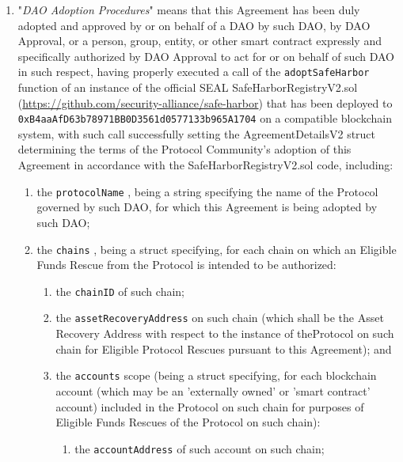 \documentclass{article}
\newcommand{\code}[1]{%
    \colorbox{red!10}{\textcolor{orange!80!black}{\texttt{#1}}}%
}
\begin{document}
\begin{enumerate}
    \item "\textit{DAO Adoption Procedures}" means that this Agreement has been duly adopted and approved by or on behalf of a DAO by such DAO, by DAO Approval, or a person, group, entity, or other smart contract expressly and specifically authorized by DAO Approval to act for or on behalf of such DAO in such respect, having properly executed a call of the \code{adoptSafeHarbor} function of an instance of the official SEAL SafeHarborRegistryV2.sol (\url{https://github.com/security-alliance/safe-harbor}) that has been deployed to \code{0xB4aaAfD63b78971BB0D3561d0577133b965A1704} on a compatible blockchain system, with such call successfully setting the AgreementDetailsV2 struct determining the terms of the Protocol Community's adoption of this Agreement in accordance with the SafeHarborRegistryV2.sol code, including:

          \begin{enumerate}
              \item the \code{protocolName}, being a string specifying the name of the Protocol governed by such DAO, for which this Agreement is being adopted by such DAO;

              \item the \code{chains}, being a struct specifying, for each chain on which an Eligible Funds Rescue from the Protocol is intended to be authorized:

                    \begin{enumerate}
                        \item the \code{chainID} of such chain;

                        \item the \code{assetRecoveryAddress} on such chain (which shall be the Asset Recovery Address with respect to the instance of theProtocol on such chain for Eligible Protocol Rescues pursuant to this Agreement); and

                        \item the \code{accounts} scope (being a struct specifying, for each blockchain account (which may be an 'externally owned' or 'smart contract' account) included in the Protocol on such chain for purposes of Eligible Funds Rescues of the Protocol on such chain):

                              \begin{enumerate}
                                  \item the \code{accountAddress} of such account on such chain;


\end{enumerate}
\end{enumerate}
\end{enumerate}
\end{enumerate}
\end{document}
